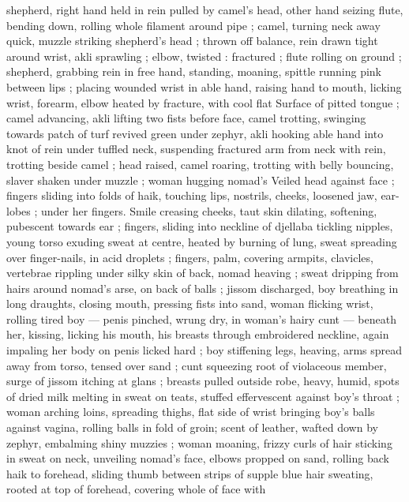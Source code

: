 shepherd, right hand held in rein pulled by camel's head, other hand 
seizing flute, bending down, rolling whole filament around pipe ; 
camel, turning neck away quick, muzzle striking shepherd's head ; 
thrown off balance, rein drawn tight around wrist, akli sprawling ; 
elbow, twisted : fractured ; flute rolling on ground ; shepherd, 
grabbing rein in free hand, standing, moaning, spittle running pink 
between lips ; placing wounded wrist in able hand, raising hand to 
mouth, licking wrist, forearm, elbow heated by fracture, with cool flat 
Surface of pitted tongue ; camel advancing, akli lifting two fists 
before face, camel trotting, swinging towards patch of turf revived 
green under zephyr, akli hooking able hand into knot of rein under 
tuffled neck, suspending fractured arm from neck with rein, trotting 
beside camel ; head raised, camel roaring, trotting with belly 
bouncing, slaver shaken under muzzle ; woman hugging nomad's 
Veiled head against face ; fingers sliding into folds of haik, touching 
lips, nostrils, cheeks, loosened jaw, ear-lobes ; under her fingers. 
Smile creasing cheeks, taut skin dilating, softening, pubescent 
towards ear ; fingers, sliding into neckline of djellaba tickling 
nipples, young torso exuding sweat at centre, heated by burning of 
lung, sweat spreading over finger-nails, in acid droplets ; fingers, 
palm, covering armpits, clavicles, vertebrae rippling under silky skin 
of back, nomad heaving ; sweat dripping from hairs around nomad's 
arse, on back of balls ; jissom discharged, boy breathing in long 
draughts, closing mouth, pressing fists into sand, woman flicking 
wrist, rolling tired boy --- penis pinched, wrung dry, in woman's hairy 
cunt --- beneath her, kissing, licking his mouth, his breasts through 
embroidered neckline, again impaling her body on penis licked hard 
; boy stiffening legs, heaving, arms spread away from torso, tensed 
over sand ; cunt squeezing root of violaceous member, surge of 
jissom itching at glans ; breasts pulled outside robe, heavy, humid, 
spots of dried milk melting in sweat on teats, stuffed effervescent 
against boy's throat ; woman arching loins, spreading thighs, flat 
side of wrist bringing boy's balls against vagina, rolling balls in fold 
of groin; scent of leather, wafted down by zephyr, embalming shiny 
muzzies ; woman moaning, frizzy curls of hair sticking in sweat on 
neck, unveiling nomad's face, elbows propped on sand, rolling back 
haik to forehead, sliding thumb between strips of supple blue hair 
sweating, rooted at top of forehead, covering whole of face with 
